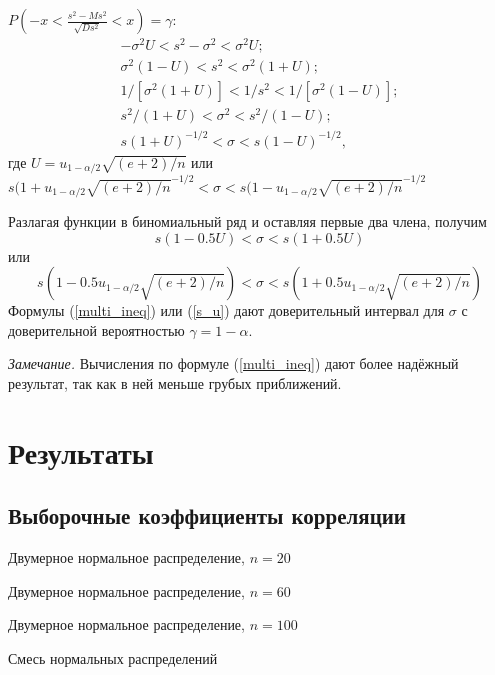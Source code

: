 \documentclass[12pt]{article}
\begin{document}
	$P\left(-x < \frac{s^{2}-Ms^{2}}{\sqrt{D s^{2}}} < x\right) = \gamma$:
	\begin{equation}
		\begin{split}
			-\sigma^{2}U < s^{2} -\sigma^{2} < \sigma^{2}U; \\
			\sigma^{2}(1-U) < s^{2} < \sigma^{2}(1 + U); \\
			1/[\sigma^{2}(1 + U)] < 1/s^{2} < 1/[\sigma^{2}(1-U)];\\
			s^{2}/(1 + U) < \sigma^{2} < s^{2}/(1-U);\\
			s(1 + U)^{-1/2} < \sigma < s(1-U)^{-1/2},
		\end{split}
		\label{multi_ineq}
	\end{equation}
	где $U = u_{1-\alpha/2}\sqrt{(e+2)/n}$ или $s(1 + u_{1-\alpha/2}\sqrt{(e + 2) / n}^{-1/2} < \sigma < s(1 - u_{1-\alpha/2}\sqrt{(e + 2) / n}^{-1/2}$

	Разлагая функции в биномиальный ряд и оставляя первые два члена, получим
	\begin{equation}
		s(1-0.5U) < \sigma < s(1 + 0.5U)
		\label{s_U}
	\end{equation}
	или
	\begin{equation}
		s(1-0.5u_{1-\alpha/2}\sqrt{(e + 2)/n}) < \sigma < s(1+0.5u_{1-\alpha/2}\sqrt{(e + 2)/n})
		\label{s_u}
	\end{equation}
	Формулы (\ref{multi_ineq}) или (\ref{s_u}) дают доверительный интервал для $\sigma$ с доверительной вероятностью $\gamma = 1-\alpha$. 

	\textit{Замечание.} Вычисления по формуле (\ref{multi_ineq}) дают более надёжный результат, так как в ней меньше грубых приближений.
	
	\section{Результаты}
	
	\subsection{Выборочные коэффициенты корреляции}
	
	\begin{table}[H]
		\centering
		
		\caption{Двумерное нормальное распределение, $n = 20$}
	\end{table}
	\begin{table}[H]
		\centering
		
		\caption{Двумерное нормальное распределение, $n = 60$}
	\end{table}
	\begin{table}[H]
		\centering
		
		\caption{Двумерное нормальное распределение, $n = 100$}
	\end{table}
	\begin{table}[H]
		\centering
		
		\caption{Смесь нормальных распределений}
	\end{table}
\end{document}
